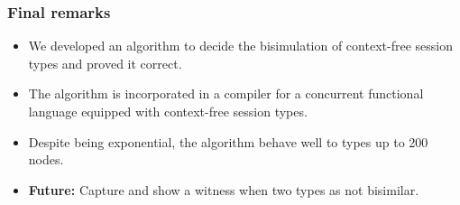 \documentclass[10pt]{beamer}
\begin{document}
\begin{frame}
  \frametitle{Final remarks}

  \begin{itemize}
  \item We developed an algorithm to decide the bisimulation of context-free
    session types and proved it correct.
  \item The algorithm is incorporated in a compiler for a concurrent functional
    language equipped with context-free session types.
    
  \item Despite being exponential, the algorithm behave well to types up to 200 nodes.
  \item \textbf{Future:} Capture and show a witness when two types as not bisimilar.
  \end{itemize}
 \end{frame}




 
\end{document}
